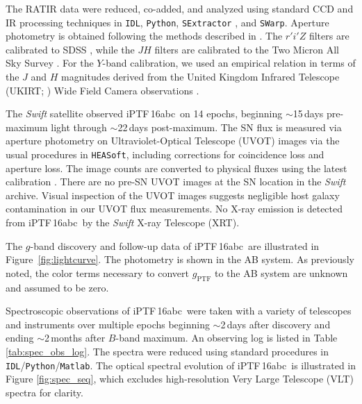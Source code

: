 \documentclass[twocolumn]{aastex61}
\newcommand{\abc}{iPTF\,16abc}
\begin{document}
The RATIR data were reduced, co-added, and analyzed using standard CCD and
IR processing techniques in \texttt{IDL}, \texttt{Python},
\texttt{SExtractor} \citep{1996A&AS..117..393B}, and \texttt{SWarp}.
Aperture photometry is obtained following the methods described in
\citet{2014AJ....148....2L}. The $r'i'Z$ filters are calibrated to SDSS
\citep{2014ApJS..211...17A}, while the $JH$ filters are calibrated to the
Two Micron All Sky Survey \citep{2006AJ....131.1163S}. For the $Y$-band
calibration, we used an empirical relation in terms of the $J$ and $H$
magnitudes derived from the United Kingdom Infrared Telescope (UKIRT;
\citealt{2007A&A...467..777C}) Wide Field Camera observations
\citep{2009MNRAS.394..675H}.

The \textit{Swift} satellite observed \abc\ on 14 epochs, beginning
$\sim$15\,days pre-maximum light through $\sim$22\,days post-maximum. The SN
flux is measured via aperture photometry on Ultraviolet-Optical Telescope
(UVOT) images via the usual procedures in \texttt{HEASoft}, including
corrections for coincidence loss and aperture loss. The image counts are
converted to physical fluxes using the latest calibration
\citep{2011AIPC.1358..373B}. There are no pre-SN UVOT images at the SN
location in the \textit{Swift} archive. Visual inspection of the UVOT images
suggests negligible host galaxy contamination in our UVOT flux measurements.
No X-ray emission is detected from \abc\ by the \textit{Swift} X-ray
Telescope (XRT).

The $g$-band discovery and follow-up data of \abc\ are illustrated in
Figure~\ref{fig:lightcurve}. The photometry is shown in the AB system. As
previously noted, the color terms necessary to convert $g_\mathrm{PTF}$ to
the AB system are unknown and assumed to be zero.

Spectroscopic observations of \abc\ were taken with a variety of telescopes
and instruments over multiple epochs beginning $\sim$2\,days after discovery
and ending $\sim$2\,months after $B$-band maximum. An observing log is
listed in Table \ref{tab:spec_obs_log}. The spectra were reduced using
standard procedures in \texttt{IDL}/\texttt{Python}/\texttt{Matlab}. The
optical spectral evolution of \abc\ is illustrated in Figure
\ref{fig:spec_seq}, which excludes high-resolution Very Large Telescope
(VLT) spectra for clarity.
\end{document}

